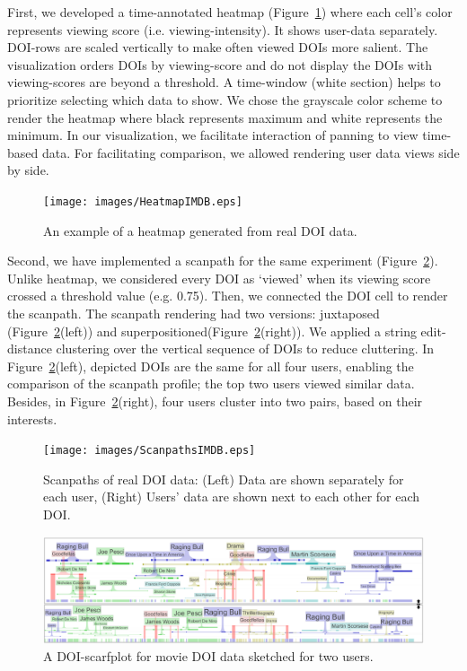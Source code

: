First, we developed a time-annotated heatmap (Figure~\ref{fig:HeatmapIMDB}) where each cell's color represents viewing score (i.e. viewing-intensity). It shows user-data separately. DOI-rows are scaled vertically to make often viewed DOIs more salient. The visualization orders DOIs by viewing-score and do not display the DOIs with viewing-scores are beyond a threshold. A time-window (white section) helps to prioritize selecting which data to show. We chose the grayscale color scheme to render the heatmap where black represents maximum and white represents the minimum. In our visualization, we facilitate interaction of panning to view time-based data. For facilitating comparison, we allowed rendering user data views side by side. 
\begin{figure}[htb]
  \centering
	\texttt{[image: images/HeatmapIMDB.eps]}
  \caption{An example of a heatmap generated from real DOI data. }
	\label{fig:HeatmapIMDB}
\end{figure}

Second, we have implemented a scanpath for the same experiment (Figure~\ref{fig:ScanpathsIMDB}). Unlike heatmap, we considered every DOI as `viewed' when its viewing score crossed a threshold value (e.g. 0.75). Then, we connected the DOI cell to render the scanpath. The scanpath rendering had two versions: juxtaposed (Figure~\ref{fig:ScanpathsIMDB}(left)) and superpositioned(Figure~\ref{fig:ScanpathsIMDB}(right)). We applied a string edit-distance clustering over the vertical sequence of DOIs to reduce cluttering. In Figure~\ref{fig:ScanpathsIMDB}(left), depicted DOIs are the same for all four users, enabling the comparison of the scanpath profile; the top two users viewed similar data. Besides, in Figure~\ref{fig:ScanpathsIMDB}(right), four users cluster into two pairs, based on their interests.
\begin{figure}[!htb]
  \centering
  \texttt{[image: images/ScanpathsIMDB.eps]}
  \caption{Scanpaths of real DOI data: (Left) Data are shown separately for each user, (Right) Users' data are shown next to each other for each DOI.}
	\label{fig:ScanpathsIMDB}
\end{figure}

\begin{figure}
  \centering
  \includegraphics[width=\linewidth]{images/ScarfsIMDB.eps}
  \caption{A DOI-scarfplot for movie DOI data sketched for two users.}
	\label{fig:ScarfsIMDB}
\end{figure}


